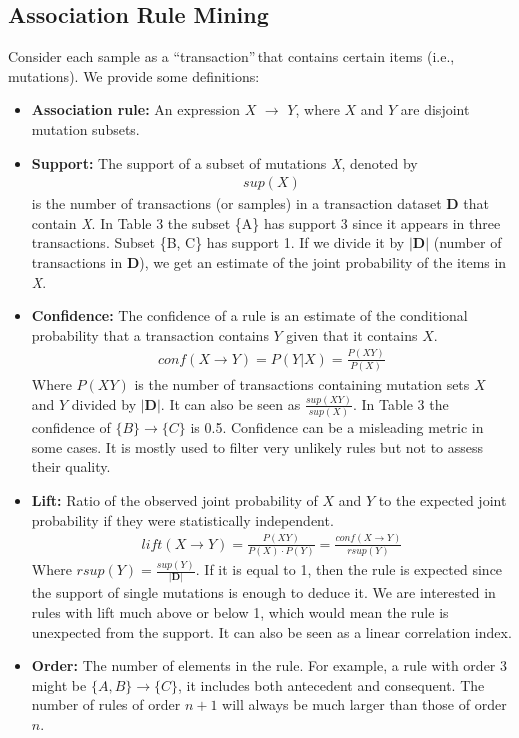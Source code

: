 \documentclass[twoside,twocolumn]{article}
\begin{document}
	\subsection{Association Rule Mining}
	Consider each sample as a \textquotedblleft transaction\textquotedblright$\,$that contains certain items (i.e., mutations). We provide some definitions:
	\begin{itemize}
		\item \textbf{Association rule:} An expression $X$ $\rightarrow$ $Y$, where $X$ and $Y$ are disjoint mutation subsets. 
		\item \textbf{Support:} The support of a subset of mutations \textit{X}, denoted by 
		\begin{align*}
			sup(X)
		\end{align*} is the number of transactions (or samples) in a transaction dataset \textbf{D} that contain \textit{X}. In Table 3 the subset \{A\} has support 3 since it appears in three transactions. Subset \{B, C\} has support 1. If we divide it by $|\mathbf{D}|$ (number of transactions in $\mathbf{D}$), we get an estimate of the joint probability of the items in \textit{X}.
		\item \textbf{Confidence:} The confidence of a rule is an estimate of the conditional probability that a transaction contains $Y$ given that it contains $X$.
		\begin{align*}
			conf(X \rightarrow Y) = P(Y|X) = \frac{P(XY)}{P(X)}
		\end{align*}
		Where $P(XY)$ is the number of transactions containing mutation sets $X$ and $Y$ divided by $|\mathbf{D}|$. It can also be seen as $\frac{sup(XY)}{sup(X)}$. In Table 3 the confidence of $\{B\} \rightarrow \{C\}$ is 0.5. Confidence can be a misleading metric in some cases. It is mostly used to filter very unlikely rules but not to assess their quality.
		\item \textbf{Lift:} Ratio of the observed joint probability of $X$ and $Y$ to the expected joint probability if they were statistically independent.	
		\begin{align*}
			lift(X \rightarrow Y) = \frac{P(XY)}{P(X)\cdot P(Y)} = \frac{conf(X\rightarrow Y)}{rsup(Y)}
		\end{align*}
		Where $rsup(Y) = \frac{sup(Y)}{|\mathbf{D}|}$. If it is equal to 1, then the rule is expected since the support of single mutations is enough to deduce it. We are interested in rules with lift much above or below 1, which would mean the rule is unexpected from the support. It can also be seen as a linear correlation index. 
		\item \textbf{Order: } The number of elements in the rule. For example, a rule with order 3 might be $\{A,B\} \rightarrow \{C\}$, it includes both antecedent and consequent. The number of rules of order $n + 1$ will always be much larger than those of order $n$.
	\end{itemize}
\end{document}
